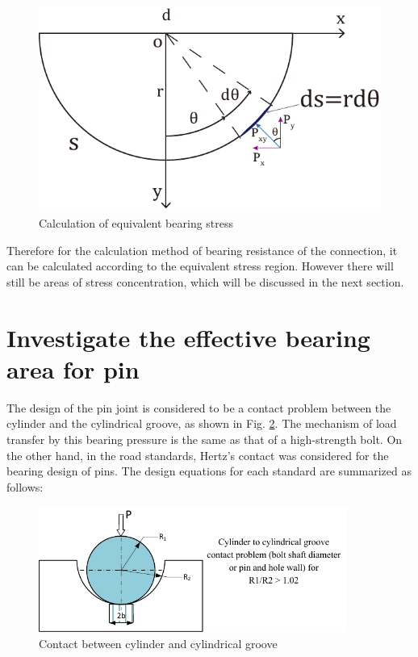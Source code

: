     

\begin{figure}[htbp]
    \centering
    \includegraphics[width=0.5\linewidth]{imgs//app/calcubea.pdf}
    \caption{Calculation of equivalent bearing stress}
    \label{fig-calcuequ}
\end{figure}


Therefore for the calculation method of bearing resistance of the connection, it can be calculated according to the equivalent stress region. However there will still be areas of stress concentration, which will be discussed in the next section.

\section{Investigate the effective bearing area for pin}


The design of the pin joint is considered to be a contact problem between the cylinder and the cylindrical groove, as shown in Fig. \ref{fig:cycon}. The mechanism of load transfer by this bearing pressure is the same as that of a high-strength bolt. On the other hand, in the road standards, Hertz's contact was considered for the bearing design of pins. The design equations for each standard are summarized as follows:

\begin{figure}[htbp]
    \centering
    \includegraphics[width=0.9\textwidth]{imgs/app/cylinders-contact.pdf}
    \caption{Contact between cylinder and cylindrical groove}
    \label{fig:cycon}
\end{figure}

